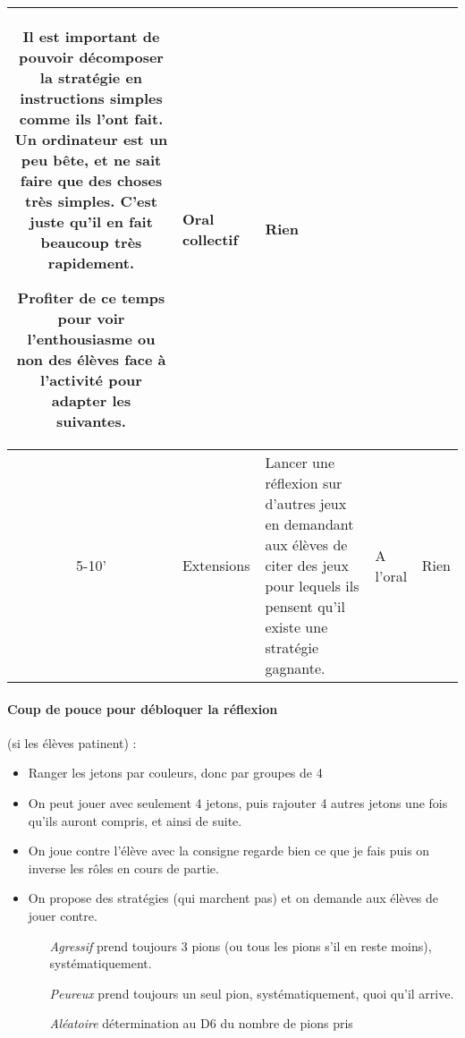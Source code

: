 \documentclass[12pt, a4paper]{article}
\begin{document}
\begin{longtable}{c|m{2.5cm}|m{5cm}|m{2.5cm}|m{3cm}}
Il est important de pouvoir décomposer la stratégie en instructions simples comme ils l'ont fait. Un ordinateur est un peu bête, et ne sait faire que des choses très simples. C'est juste qu'il en fait beaucoup très rapidement.

Profiter de ce temps pour voir l'enthousiasme ou non des élèves face à l'activité pour adapter les suivantes.

& 

Oral collectif 

& 

Rien

\\ \hline

5-10'

&

Extensions

&

Lancer une réflexion sur d'autres jeux en demandant aux élèves de citer des jeux pour lequels ils pensent qu'il existe une stratégie gagnante.

&

A l'oral

&

Rien

\end{longtable}

\paragraph*{Coup de pouce pour débloquer la réflexion} (si les élèves patinent) :
\begin{itemize}
\item Ranger les jetons par couleurs, donc par groupes de 4
\item On peut jouer avec seulement 4 jetons, puis rajouter 4 autres jetons une fois qu'ils auront compris,
et ainsi de suite.
\item On joue contre l'élève
avec la consigne \og regarde bien ce que je fais\fg{}
puis on inverse les rôles en cours de partie.
\item On propose des stratégies (qui marchent pas) et on demande aux élèves de jouer contre.
\begin{itemize}
\item[\emph{Agressif}] prend toujours 3 pions (ou tous les pions s'il en reste moins), systématiquement.
\item[\emph{Peureux}] prend toujours un seul pion, systématiquement, quoi qu'il arrive.
\item[\emph{Aléatoire}] détermination au D6 du nombre de pions pris
\end{itemize}
\end{itemize}
\end{document}
